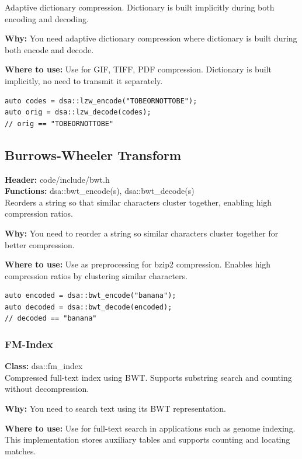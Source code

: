 \documentclass[11pt]{article}
\begin{document}
Adaptive dictionary compression. Dictionary is built implicitly during both encoding and decoding.

\textbf{Why:} You need adaptive dictionary compression where dictionary is built during both encode and decode. \par \textbf{Where to use:} Use for GIF, TIFF, PDF compression. Dictionary is built implicitly, no need to transmit it separately.

\begin{lstlisting}
auto codes = dsa::lzw_encode("TOBEORNOTTOBE");
auto orig = dsa::lzw_decode(codes);
// orig == "TOBEORNOTTOBE"
\end{lstlisting}

\subsection{Burrows-Wheeler Transform}
\textbf{Header:} code/include/bwt.h\\
\textbf{Functions:} dsa::bwt\_encode(s), dsa::bwt\_decode(s)\\

Reorders a string so that similar characters cluster together, enabling high compression ratios.

\textbf{Why:} You need to reorder a string so similar characters cluster together for better compression. \par \textbf{Where to use:} Use as preprocessing for bzip2 compression. Enables high compression ratios by clustering similar characters.

\begin{lstlisting}
auto encoded = dsa::bwt_encode("banana");
auto decoded = dsa::bwt_decode(encoded);
// decoded == "banana"
\end{lstlisting}

\subsubsection{FM-Index}
\textbf{Class:} dsa::fm\_index\\

Compressed full-text index using BWT. Supports substring search and counting without decompression.

\textbf{Why:} You need to search text using its BWT representation. \par \textbf{Where to use:} Use for full-text search in applications such as genome indexing. This implementation stores auxiliary tables and supports counting and locating matches.
\end{document}
